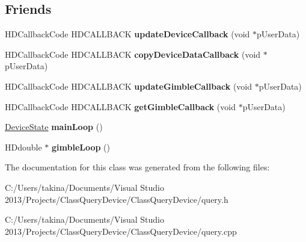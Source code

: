 \subsection*{Friends}
\begin{DoxyCompactItemize}
\item 
\hypertarget{classquery_a12b1c429209df84178bb31a58dd08c03}{}\label{classquery_a12b1c429209df84178bb31a58dd08c03} 
H\+D\+Callback\+Code H\+D\+C\+A\+L\+L\+B\+A\+CK {\bfseries update\+Device\+Callback} (void $\ast$p\+User\+Data)
\item 
\hypertarget{classquery_aba616ef81cfbb501fa58e61dfd461ff8}{}\label{classquery_aba616ef81cfbb501fa58e61dfd461ff8} 
H\+D\+Callback\+Code H\+D\+C\+A\+L\+L\+B\+A\+CK {\bfseries copy\+Device\+Data\+Callback} (void $\ast$p\+User\+Data)
\item 
\hypertarget{classquery_a4eb59d37953d50b6deae2c682209a53d}{}\label{classquery_a4eb59d37953d50b6deae2c682209a53d} 
H\+D\+Callback\+Code H\+D\+C\+A\+L\+L\+B\+A\+CK {\bfseries update\+Gimble\+Callback} (void $\ast$p\+User\+Data)
\item 
\hypertarget{classquery_a4712611900d4bfa44e7b3ecc41207ec8}{}\label{classquery_a4712611900d4bfa44e7b3ecc41207ec8} 
H\+D\+Callback\+Code H\+D\+C\+A\+L\+L\+B\+A\+CK {\bfseries get\+Gimble\+Callback} (void $\ast$p\+User\+Data)
\item 
\hypertarget{classquery_a9027350e8f60998a5c8a49e7cde05a05}{}\label{classquery_a9027350e8f60998a5c8a49e7cde05a05} 
\hyperlink{struct_device_state}{Device\+State} {\bfseries main\+Loop} ()
\item 
\hypertarget{classquery_a22296dd781e0b80f702c83993fa6ebb4}{}\label{classquery_a22296dd781e0b80f702c83993fa6ebb4} 
H\+Ddouble $\ast$ {\bfseries gimble\+Loop} ()
\end{DoxyCompactItemize}


The documentation for this class was generated from the following files\+:\begin{DoxyCompactItemize}
\item 
C\+:/\+Users/takina/\+Documents/\+Visual Studio 2013/\+Projects/\+Class\+Query\+Device/\+Class\+Query\+Device/query.\+h\item 
C\+:/\+Users/takina/\+Documents/\+Visual Studio 2013/\+Projects/\+Class\+Query\+Device/\+Class\+Query\+Device/query.\+cpp\end{DoxyCompactItemize}
